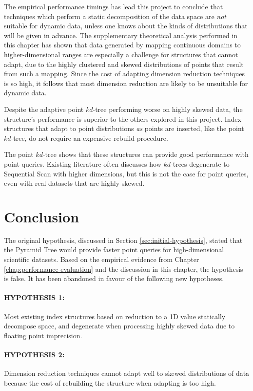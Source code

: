 The empirical performance timings has lead this project to conclude that techniques which perform a static decomposition of the data space are \textit{not} suitable for dynamic data, unless one knows about the kinds of distributions that will be given in advance. The supplementary theoretical analysis performed in this chapter has shown that data generated by mapping continuous domains to higher-dimensional ranges are especially a challenge for structures that cannot adapt, due to the highly clustered and skewed distributions of points that result from such a mapping. Since the cost of adapting dimension reduction techniques is so high, it follows that most dimension reduction are likely to be unsuitable for dynamic data.

Despite the adaptive point $kd$-tree performing worse on highly skewed data, the structure's performance is superior to the others explored in this project. Index structures that adapt to point distributions \textit{as} points are inserted, like the point $kd$-tree, do not require an expensive rebuild procedure.

The point $kd$-tree shows that these structures can provide good performance with point queries. Existing literature often discusses how $kd$-trees degenerate to Sequential Scan with higher dimensions, but this is not the case for point queries, even with real datasets that are highly skewed.

\section{Conclusion}

The original hypothesis, discussed in Section \ref{sec:initial-hypothesis}, stated that the Pyramid Tree would provide faster point queries for high-dimensional scientific datasets. Based on the empirical evidence from Chapter \ref{chap:performance-evaluation} and the discussion in this chapter, the hypothesis is false. It has been abandoned in favour of the following new hypotheses.

\paragraph{\textbf{HYPOTHESIS 1:}} Most existing index structures based on reduction to a 1D value statically decompose space, and degenerate when processing highly skewed data due to floating point imprecision.

\paragraph{\textbf{HYPOTHESIS 2:}} Dimension reduction techniques cannot adapt well to skewed distributions of data because the cost of rebuilding the structure when adapting is too high.

